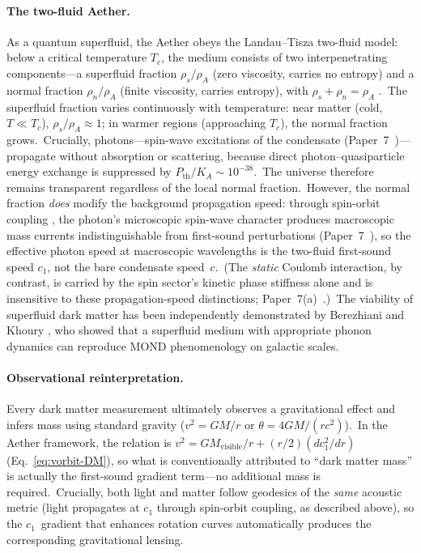 ﻿\documentclass[12pt,letterpaper]{article}
\newcommand{\rhoa}{\rho_{\!A}}
\newcommand{\Ka}{K_{\!A}}
\begin{document}
\paragraph{The two-fluid Aether.}
As a quantum superfluid, the Aether obeys the Landau--Tisza two-fluid model:
below a critical temperature $T_c$, the medium consists of two interpenetrating
components---a superfluid fraction $\rho_s/\rhoa$ (zero viscosity, carries no
entropy) and a normal fraction $\rho_n/\rhoa$ (finite viscosity, carries entropy),
with $\rho_s + \rho_n = \rhoa$ \cite{berezhiani2015}.\ The superfluid fraction
varies continuously with temperature: near matter (cold, $T \ll T_c$),
$\rho_s/\rhoa \approx 1$; in warmer regions (approaching $T_c$), the normal
fraction grows.\ Crucially, photons---spin-wave excitations of the condensate
(Paper~7~\cite{otto-quantum})---propagate without absorption or scattering,
because direct photon--quasiparticle energy exchange is suppressed by
$P_{\mathrm{th}}/\Ka \sim 10^{-38}$.\ The universe therefore remains
transparent regardless of the local normal fraction.\ However, the
normal fraction \emph{does} modify the background propagation speed:
through spin-orbit coupling \cite{volovik2003}, the photon's microscopic
spin-wave character produces macroscopic mass currents indistinguishable
from first-sound perturbations (Paper~7~\cite{otto-quantum}), so the
effective photon speed at macroscopic wavelengths is the two-fluid
first-sound speed $c_1$, not the bare condensate speed~$c$.\ (The
\emph{static} Coulomb interaction, by contrast, is carried by the spin
sector's kinetic phase stiffness alone and is insensitive to these
propagation-speed distinctions; Paper~7(a)~\cite{otto-boundcore}.)\ The viability of superfluid dark
matter has been independently demonstrated by Berezhiani and Khoury
\cite{berezhiani2015}, who showed that a superfluid medium with appropriate
phonon dynamics can reproduce MOND phenomenology on galactic scales.

\paragraph{Observational reinterpretation.}
Every dark matter measurement ultimately observes a gravitational effect and
infers mass using standard gravity ($v^2 = GM/r$ or $\theta = 4GM/(rc^2)$).\
In the Aether framework, the relation is $v^2 = GM_{\mathrm{visible}}/r +
(r/2)(dc_1^2/dr)$ (Eq.~\ref{eq:vorbit-DM}), so what is conventionally
attributed to ``dark matter mass'' is actually the first-sound gradient
term---no additional mass is required.\ Crucially, both light and matter
follow geodesics of the \emph{same} acoustic metric (light propagates at
$c_1$ through spin-orbit coupling, as described above), so the
$c_1$~gradient that enhances rotation curves automatically produces the
corresponding gravitational lensing.
\end{document}
